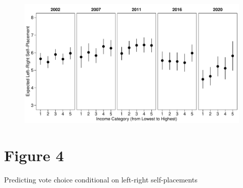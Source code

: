 \documentclass[12pt,letterpaper]{article}
\begin{document}
\begin{figure}
	\centering
	\includegraphics[width=0.8\linewidth]{fig_03}

\end{figure}


\newpage

\section*{Figure 4} 
\vspace{.25cm}

 Predicting vote choice conditional on left-right self-placements
\end{document}
